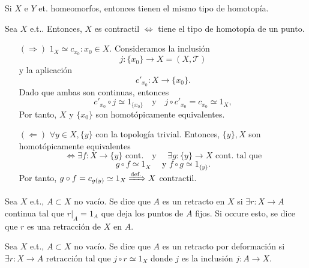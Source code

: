 \begin{obs}
  Si $X$ e $Y$ et. homeomorfos, entonces tienen el mismo tipo de homotopía.
\end{obs}

\begin{prop}
  Sea $X$ e.t.. Entonces, $X$ es contractil $\Leftrightarrow$ tiene el tipo de homotopía de un punto.
\end{prop}

\begin{dem}
  \begin{enumerate}[label=(\roman*)]
    \item []
    \item [$(\Rightarrow)$] $1_{X} \simeq c_{x_{0}} : x_{0} \in X$. Consideramos la inclusión
      \[ 
        j : \{ x_{0} \} \to X = ( X, \mathcal{T} ) 
      \] 
      y la aplicación
      \[ 
        c'_{x_{0}} : X \to \{ x_{0} \}.
      \] 
      Dado que ambas son continuas, entonces
      \[
        c'_{x_{0}} \circ j \simeq 1_{\{ x_{0} \}} \quad \text{y} \quad j \circ c'_{x_{0}} = c_{x_{0}} \simeq 1_{X},
      \]
      Por tanto, $X$ y $\{ x_{0} \}$ son homotópicamente equivalentes.
    \item [$(\Leftarrow)$] $\forall y \in X, \{ y \}$ con la topología trivial. Entonces, $\{ y \}, X$ son homotópicamente equivalentes
      \[
        \Leftrightarrow \exists f : X \to \{ y \} \text{ cont.} \quad \text{y } \quad \exists g : \{ y \} \to X \text{ cont.} \text{ tal que}
      \]
      \[
        g \circ f \simeq 1_{X} \quad \text{ y } f \circ g \simeq 1_{\{ y \}}.
      \]
      Por tanto, $g \circ f = c_{g(y)} \simeq 1_{X} \xRightarrow[]{ \text{def.} } X$ contractil.

  \end{enumerate}
\end{dem}

\begin{defn}[Retracción]
  Sea $X$ e.t., $A \subset X$ no vacío. Se dice que $A$ es un retracto en $X$ si $\exists r : X \to A$ continua tal que $r|_{A} = 1_{A}$ que deja los puntos de $A$ fijos. Si occure esto, se dice que $r$ es una retracción de $X$ en $A$.
\end{defn}

\begin{defn}
  Sea $X$ e.t., $A \subset X$ no vacío. Se dice que $A$ es un retracto por deformación si $\exists r : X \to A$ retracción tal que $j \circ r \simeq 1_{X}$ donde $j$ es la inclusión $j : A \to X$.
\end{defn}
